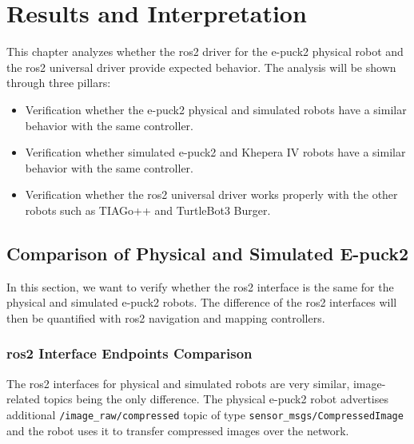 \chapter{Results and Interpretation}
\label{chap:results}

This chapter analyzes whether the \ac{ros2} driver for the e-puck2 physical robot and the \ac{ros2} universal driver provide expected behavior. The analysis will be shown through three pillars:
\begin{itemize}
    \item Verification whether the e-puck2 physical and simulated robots have a similar behavior with the same controller.
    \item Verification whether simulated e-puck2 and Khepera IV robots have a similar behavior with the same controller.
    \item Verification whether the \ac{ros2} universal driver works properly with the other robots such as TIAGo++ and TurtleBot3 Burger.
\end{itemize}


\section{Comparison of Physical and Simulated E-puck2}

In this section, we want to verify whether the \ac{ros2} interface is the same for the physical and simulated e-puck2 robots.
The difference of the \ac{ros2} interfaces will then be quantified with \ac{ros2} navigation and mapping controllers.

\subsection{\ac{ros2} Interface Endpoints Comparison}

The \ac{ros2} interfaces for physical and simulated robots are very similar, image-related topics being the only difference.
The physical e-puck2 robot advertises additional \texttt{/image\_raw/compressed} topic of type \texttt{sensor\_msgs/CompressedImage} and the robot uses it to transfer compressed images over the network.

